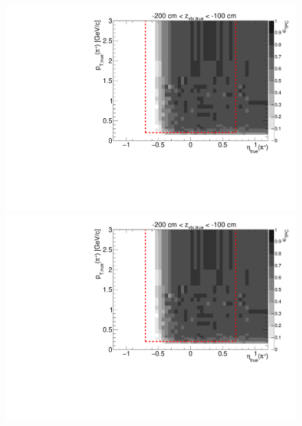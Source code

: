 \begin{figure}[hb]
{  \includegraphics[width=\linewidth,page=16]{graphics/eff/Eff2D_TPC_pion_Plus.pdf}\\
  \includegraphics[width=\linewidth,page=18]{graphics/eff/Eff2D_TPC_pion_Plus.pdf}
}%
\end{figure}





